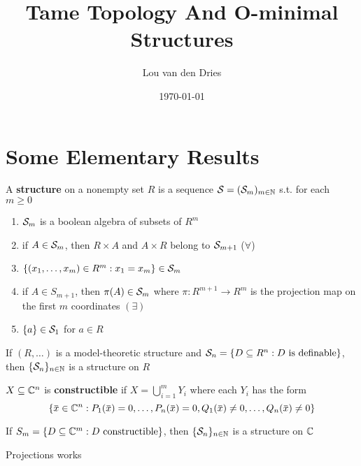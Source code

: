 \documentclass[11pt]{article}
\author{Lou van den Dries}
\date{\today}
\title{Tame Topology And O-minimal Structures}
\begin{document}
\maketitle
\tableofcontents


\section{Some Elementary Results}
\label{sec:org226eacd}
\begin{definition}[]
A \textbf{structure} on a nonempty set \(R\) is a sequence \(\mathcal{S}=(\mathcal{S}_m)_{m\in\mathbb{N}}\) s.t. for each \(m\ge 0\)
\begin{enumerate}
\item \(\mathcal{S}_m\) is a boolean algebra of subsets of \(R^m\)
\item if \(A\in\mathcal{S}_m\), then \(R\times A\) and \(A\times R\) belong to \(\mathcal{S}_{m+1}\) (\(\forall\))
\item \(\{(x_1,\dots,x_m)\in R^m:x_1=x_m\}\in\mathcal{S}_m\)
\item if \(A\in S_{m+1}\), then \(\pi(A)\in\mathcal{S}_m\) where \(\pi:R^{m+1}\to R^m\) is the projection map on the
first \(m\) coordinates \((\exists)\)
\item \(\{a\}\in\mathcal{S}_1\) for \(a\in R\)
\end{enumerate}
\end{definition}

\begin{fact}[]
If \((R,\dots)\) is a model-theoretic structure and \(\mathcal{S}_n=\{D\subseteq R^n:D\text{ is definable}\}\),
then \(\{\mathcal{S}_n\}_{n\in\mathbb{N}}\) is a structure on \(R\)
\end{fact}

\begin{definition}[]
\(X\subseteq\mathbb{C}^n\) is \textbf{constructible} if \(X=\bigcup_{i=1}^mY_i\) where each \(Y_i\) has the form
\begin{equation*}
\{\barx\in\C^n:P_1(\barx)=0,\dots,P_n(\barx)=0, Q_1(\barx)\neq 0,\dots,Q_n(\barx)\neq 0\}
\end{equation*}
\end{definition}

\begin{fact}[]
If \(S_m=\{D\subseteq\mathbb{C}^m:D\text{ constructible}\}\), then \(\{\mathcal{S}_n\}_{n\in\mathbb{N}}\) is a structure on \(\mathbb{C}\)
\end{fact}

\begin{theorem}
Projections works
\end{theorem}
\end{document}
